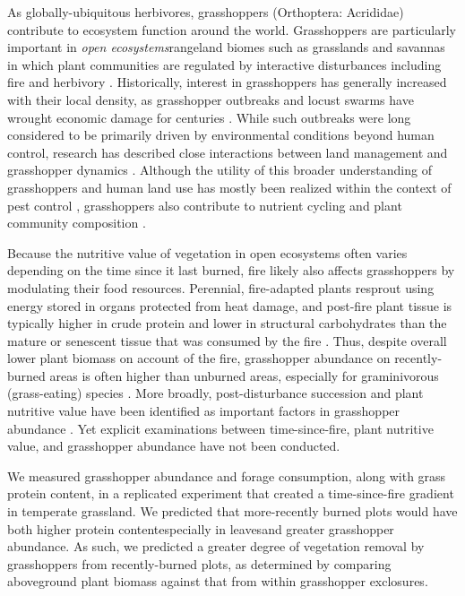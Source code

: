 \documentclass[referee, 
	            sn-basic]
           {sn-jnl}
\begin{document}
As globally-ubiquitous herbivores, grasshoppers (Orthoptera: Acrididae) contribute to ecosystem function around the world. 
Grasshoppers are particularly important in \emph{open ecosystems}\textemdash rangeland biomes such as grasslands and savannas in which plant communities are regulated by interactive disturbances including fire and herbivory \citep{bond2022}. 
Historically, interest in grasshoppers has generally increased with their local density, as grasshopper outbreaks and locust swarms have wrought economic damage for centuries \citep{cease2015}. 
While such outbreaks were long considered to be primarily driven by environmental conditions beyond human control, research has described close interactions between land management and grasshopper dynamics \citep{legall2019}. 
Although the utility of this broader understanding of grasshoppers and human land use has mostly been realized within the context of pest control \citep{branson2006}, grasshoppers also contribute to nutrient cycling and plant community composition \citep{meyer2002,zhang2011,kietzka2021, belovsky2000}. 

Because the nutritive value of vegetation in open ecosystems often varies depending on the time since it last burned, fire likely also affects grasshoppers by modulating their food resources. 
Perennial, fire-adapted plants resprout using energy stored in organs protected from heat damage, and post-fire plant tissue is typically higher in crude protein and lower in structural carbohydrates than the mature or senescent tissue that was consumed by the fire \citep{mcgranahan2021}. 
Thus, despite overall lower plant biomass on account of the fire, grasshopper abundance on recently-burned areas is often higher than unburned areas, especially for graminivorous (grass-eating) species \citep{meyer2002}. 
More broadly, post-disturbance succession and plant nutritive value have been identified as important factors in grasshopper abundance \citep{fartmann2012, schirmel2019}. 
Yet explicit examinations between time-since-fire, plant nutritive value, and grasshopper abundance have not been conducted. 

We measured grasshopper abundance and forage consumption, along with grass protein content, in a replicated experiment that created a time-since-fire gradient in temperate grassland.  
We predicted that more-recently burned plots would have both higher protein content\textemdash especially in leaves\textemdash and greater grasshopper abundance. 
As such, we predicted a greater degree of vegetation removal by grasshoppers from recently-burned plots, as determined by comparing aboveground plant biomass against that from within grasshopper exclosures. 
\end{document}
